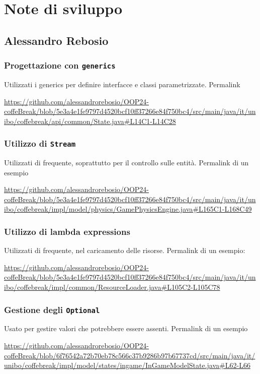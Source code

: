 \documentclass[a4paper,12pt]{report}
\begin{document}
\newpage
\section{Note di sviluppo}

\subsection{Alessandro Rebosio}
\subsubsection{Progettazione con \texttt{generics}}
Utilizzati i generics per definire interfacce e classi parametrizzate. Permalink
\begin{sloppypar}
	\raggedright
	\url{https://github.com/alessandrorebosio/OOP24-coffeBreak/blob/5e3a4e1fe9797d4520bcf10ff37266e84f750bc4/src/main/java/it/unibo/coffebreak/api/common/State.java#L14C1-L14C28}
\end{sloppypar}

\subsubsection{Utilizzo di \texttt{Stream}}
Utilizzati di frequente, soprattutto per il controllo sulle entità. Permalink di un esempio
\begin{sloppypar}
	\raggedright
	\url{https://github.com/alessandrorebosio/OOP24-coffeBreak/blob/5e3a4e1fe9797d4520bcf10ff37266e84f750bc4/src/main/java/it/unibo/coffebreak/impl/model/physics/GamePhysicsEngine.java#L165C1-L168C49}
\end{sloppypar}

\subsubsection{Utilizzo di lambda expressions}
Utilizzati di frequente, nel caricamento delle risorse. Permalink di un esempio:
\begin{sloppypar}
	\raggedright
	\url{https://github.com/alessandrorebosio/OOP24-coffeBreak/blob/5e3a4e1fe9797d4520bcf10ff37266e84f750bc4/src/main/java/it/unibo/coffebreak/impl/common/ResourceLoader.java#L105C2-L105C78}
\end{sloppypar}

\subsubsection{Gestione degli \texttt{Optional}}
Usato per gestire valori che potrebbere essere assenti. Permalink di un esempio
\begin{sloppypar}
	\raggedright
	\url{https://github.com/alessandrorebosio/OOP24-coffeBreak/blob/6f76542a72b70eb78c566c37b9286b97b67737cd/src/main/java/it/unibo/coffebreak/impl/model/states/ingame/InGameModelState.java#L62-L66}
\end{sloppypar}
\end{document}
